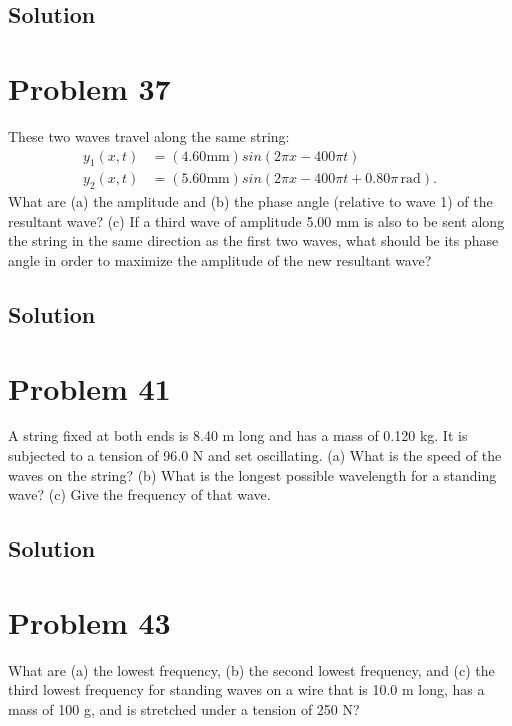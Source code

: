 \documentclass[12pt]{article}
\begin{document}
        \subsection{Solution}

    \section{Problem 37}
        These two waves travel along the same string:
        \begin{align}
            y_1(x, t)   &=  (4.60 \unit{\milli\meter}) sin(2\pi x - 400\pi t)\\
            y_2(x, t)   &=  (5.60 \unit{\milli\meter}) sin(2\pi x - 400\pi t + 0.80\pi\,\unit{\radian}).
        \end{align}
        What are (a) the amplitude and (b) the phase angle (relative to wave 1) of the resultant wave? 
        (c) If a third wave of amplitude 5.00 mm is also to be sent along the string in the same direction as the first two waves, what should be its phase angle in order to maximize the amplitude of the new resultant wave?

        \subsection{Solution}

    \section{Problem 41}
        A string fixed at both ends is 8.40 m long and has a mass of 0.120 kg. 
        It is subjected to a tension of 96.0 N and set oscillating. 
        (a) What is the speed of the waves on the string? 
        (b) What is the longest possible wavelength for a standing wave? 
        (c) Give the frequency of that wave.

        \subsection{Solution}

    \section{Problem 43}
        What are (a) the lowest frequency, (b) the second lowest frequency, and (c) the third lowest frequency for standing waves on a wire that is 10.0 m long, has a mass of 100 g, and is stretched under a tension of 250 N?
\end{document}
